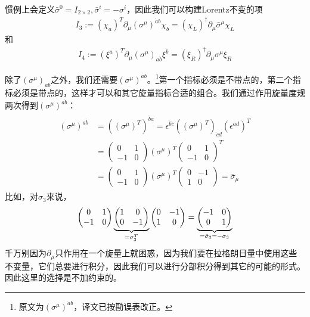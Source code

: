 惯例上会定义$\bar\sigma^0=I_{2\times2},\bar\sigma^i=-\sigma^i$，因此我们可以构建Lorentz不变的项
\begin{align}
\label{equ6.10}
I_3:=(\chi_{\dot{a}})^T\partial_\mu(\sigma^\mu)^{\dot{a}b}\chi_b=(\chi_L)^\dagger\partial_\mu\bar\sigma^\mu\chi_L
\end{align}
和
\begin{align}
\label{equ6.11}
I_4:=(\xi^a)^T\partial_\mu(\sigma^\mu)_{a\dot{b}}\xi^{\dot{b}}=(\xi_R)^\dagger\partial_\mu\sigma^\mu\xi_R
\end{align}

除了$(\sigma^\mu)_{a\dot{b}}$之外，我们还需要$(\sigma^\mu)^{a \dot{b}}$。\footnote{原文为$(\sigma^\mu)^{\dot{a} b}$，译文已按勘误表改正。}第一个指标必须是不带点的，第二个指标必须是带点的，这样才可以和其它旋量指标合适的组合。我们通过作用旋量度规两次得到$(\sigma^\mu)^{a\dot{b}}$：
\begin{align}
\label{equ6.12}
\begin{split}
(\sigma^\mu)^{a\dot{b}}&=((\sigma^\mu)^T)^{\dot{b}a}=\epsilon^{\dot{b}\dot{c}}((\sigma^\mu)^T)_{\dot{c}d}(\epsilon^{ad})^T\\
&=\left(\begin{matrix}0&1\\-1&0\end{matrix}\right)(\sigma^\mu)^T\left(\begin{matrix}0&1\\-1&0\end{matrix}\right)^T\\
&=\left(\begin{matrix}0&1\\-1&0\end{matrix}\right)(\sigma^\mu)^T\left(\begin{matrix}0&-1\\1&0\end{matrix}\right)=\bar\sigma_\mu
\end{split}\end{align}
比如，对$\sigma_3$来说，
\[\left(\begin{matrix}0&1\\-1&0\end{matrix}\right)\underbrace{\left(\begin{matrix}1&0\\0&-1\end{matrix}\right)}_{=\sigma_3^T}\left(\begin{matrix}0&-1\\1&0\end{matrix}\right)=\underbrace{\left(\begin{matrix}-1&0\\0&1\end{matrix}\right)}_{\mathclap{=\bar\sigma_3=-\sigma_3}} \]
千万别因为$\partial_\mu$只作用在一个旋量上就困惑，因为我们要在拉格朗日量中使用这些不变量，它们总要进行积分，因此我们可以进行分部积分得到其它的可能的形式。因此这里的选择是不加约束的。


